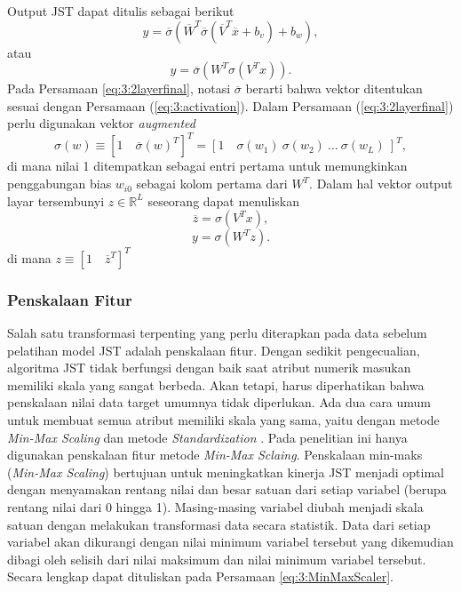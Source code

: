 \noindent Output JST dapat ditulis sebagai berikut
\begin{equation} \label{eq:3:2layer}
y = \overline{\sigma}
\left(
	\overline{W}^T\overline{\sigma}(\overline{V}^T\overline{x}+b_v)+b_w
\right),
\end{equation}
atau
\begin{equation} \label{eq:3:2layerfinal}
y = \overline{\sigma}
\left(
	W^T\sigma(V^Tx)
\right).
\end{equation}
Pada Persamaan \ref{eq:3:2layerfinal}, notasi $\overline{\sigma}$ berarti bahwa vektor ditentukan sesuai dengan Persamaan (\ref{eq:3:activation}). Dalam Persamaan (\ref{eq:3:2layerfinal}) perlu digunakan vektor \textit{augmented}
\begin{equation} \label{eq:3:augVector}
\sigma(w) \equiv [1\quad \overline{\sigma}(w)^T]^T = [1\quad \sigma(w_1)\ \sigma(w_2)\ \dots\ \sigma(w_L)\ ]^T,
\end{equation}
\noindent di mana nilai 1 ditempatkan sebagai entri pertama untuk memungkinkan penggabungan bias $w_{i0}$ sebagai kolom pertama dari $W^T$. Dalam hal vektor output layar tersembunyi $z\in \mathbb{R}^L$ seseorang dapat menuliskan
\begin{equation} \label{eq:3:final19}
\overline{z} = \sigma(V^Tx),
\end{equation}
\begin{equation} \label{eq:3:final20}
y = \sigma(W^Tz).
\end{equation}
\noindent di mana $z \equiv [1\quad \overline{z}^T]^T$

\subsubsection{Penskalaan Fitur}

Salah satu transformasi terpenting yang perlu diterapkan pada data sebelum pelatihan model JST adalah penskalaan fitur. Dengan sedikit pengecualian, algoritma JST tidak berfungsi dengan baik saat atribut numerik masukan memiliki skala yang sangat berbeda. Akan tetapi, harus diperhatikan bahwa penskalaan nilai data target umumnya tidak diperlukan. Ada dua cara umum untuk membuat semua atribut memiliki skala yang sama, yaitu dengan metode \textit{Min-Max Scaling} dan metode \textit{Standardization} \cite{HandsOnML}. Pada penelitian ini hanya digunakan penskalaan fitur metode \textit{Min-Max Sclaing}. Penskalaan min-maks (\textit{Min-Max Scaling}) bertujuan untuk meningkatkan kinerja JST menjadi optimal dengan menyamakan rentang nilai dan besar satuan dari setiap variabel (berupa rentang nilai dari 0 hingga 1). Masing-masing variabel diubah menjadi skala satuan dengan melakukan transformasi data secara statistik. Data dari setiap variabel akan dikurangi dengan nilai minimum variabel tersebut yang dikemudian dibagi oleh selisih dari nilai maksimum dan nilai minimum variabel tersebut. Secara lengkap dapat dituliskan pada Persamaan \ref{eq:3:MinMaxScaler}.

